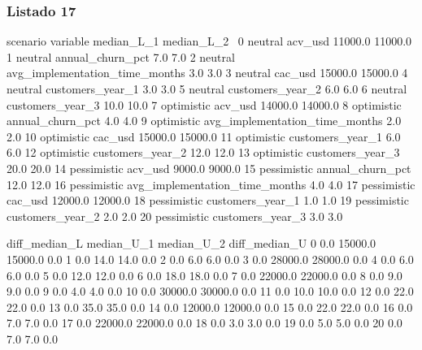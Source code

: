 \subsubsection{Listado 17}
\label{anexo:code-6-3-2-17}

\begin{APACode}
       scenario                        variable  median_L_1  median_L_2  \
0       neutral                         acv_usd     11000.0     11000.0   
1       neutral                annual_churn_pct         7.0         7.0   
2       neutral  avg_implementation_time_months         3.0         3.0   
3       neutral                         cac_usd     15000.0     15000.0   
4       neutral                customers_year_1         3.0         3.0   
5       neutral                customers_year_2         6.0         6.0   
6       neutral                customers_year_3        10.0        10.0   
7    optimistic                         acv_usd     14000.0     14000.0   
8    optimistic                annual_churn_pct         4.0         4.0   
9    optimistic  avg_implementation_time_months         2.0         2.0   
10   optimistic                         cac_usd     15000.0     15000.0   
11   optimistic                customers_year_1         6.0         6.0   
12   optimistic                customers_year_2        12.0        12.0   
13   optimistic                customers_year_3        20.0        20.0   
14  pessimistic                         acv_usd      9000.0      9000.0   
15  pessimistic                annual_churn_pct        12.0        12.0   
16  pessimistic  avg_implementation_time_months         4.0         4.0   
17  pessimistic                         cac_usd     12000.0     12000.0   
18  pessimistic                customers_year_1         1.0         1.0   
19  pessimistic                customers_year_2         2.0         2.0   
20  pessimistic                customers_year_3         3.0         3.0   

    diff_median_L  median_U_1  median_U_2  diff_median_U  
0             0.0     15000.0     15000.0            0.0  
1             0.0        14.0        14.0            0.0  
2             0.0         6.0         6.0            0.0  
3             0.0     28000.0     28000.0            0.0  
4             0.0         6.0         6.0            0.0  
5             0.0        12.0        12.0            0.0  
6             0.0        18.0        18.0            0.0  
7             0.0     22000.0     22000.0            0.0  
8             0.0         9.0         9.0            0.0  
9             0.0         4.0         4.0            0.0  
10            0.0     30000.0     30000.0            0.0  
11            0.0        10.0        10.0            0.0  
12            0.0        22.0        22.0            0.0  
13            0.0        35.0        35.0            0.0  
14            0.0     12000.0     12000.0            0.0  
15            0.0        22.0        22.0            0.0  
16            0.0         7.0         7.0            0.0  
17            0.0     22000.0     22000.0            0.0  
18            0.0         3.0         3.0            0.0  
19            0.0         5.0         5.0            0.0  
20            0.0         7.0         7.0            0.0  
\end{APACode}

